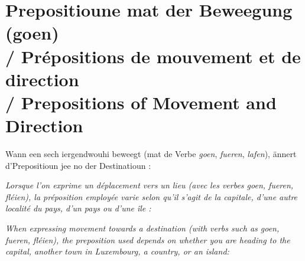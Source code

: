 \vspace{1.5em}

\section[Prepositioune mat goen / Prepositions of Direction]{Prepositioune mat der Beweegung (goen) \\/ Prépositions de mouvement et de direction \\/ Prepositions of Movement and Direction}

Wann een sech iergendwouhi beweegt (mat de Verbe \textit{goen}, \textit{fueren}, \textit{lafen}), ännert d'Prepositioun jee no der Destinatioun :

\textit{Lorsque l'on exprime un déplacement vers un lieu (avec les verbes \textit{goen}, \textit{fueren}, \textit{fléien}), la préposition employée varie selon qu'il s'agit de la capitale, d'une autre localité du pays, d'un pays ou d'une île :}

\textit{When expressing movement towards a destination (with verbs such as \textit{goen}, \textit{fueren}, \textit{fléien}), the preposition used depends on whether you are heading to the capital, another town in Luxembourg, a country, or an island:}

